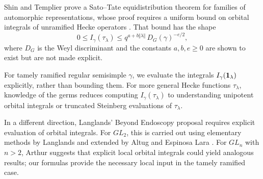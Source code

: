\documentclass{amsart}
\numberwithin{equation}{section}
\theoremstyle{definition}
\def\16{{\bf 16}}
\def\1{{\bf 1}}
\begin{document}
Shin and Templier \cite{ST} prove a Sato--Tate equidistribution theorem for families of automorphic representations, whose proof requires a uniform bound on orbital integrals of unramified Hecke operators \cite[Proposition 7.1]{ST}. That bound has the shape
$$0\le I_\gamma(\tau_\lambda)\le q^{a+b\Vert\lambda\Vert}\,D_G(\gamma)^{-e/2},$$
where $D_G$ is the Weyl discriminant and the constants $a,b,e\ge 0$ are shown to exist but are not made explicit.

For tamely ramified regular semisimple $\gamma$, we evaluate the integrals $I_\gamma(\1_\lambda)$ explicitly, rather than bounding them. For more general Hecke functions $\tau_\lambda$, knowledge of the germs reduces computing $I_\gamma(\tau_\lambda)$ to understanding unipotent orbital integrals or truncated Steinberg evaluations of $\tau_\lambda$.  

In a different direction, Langlands' Beyond Endoscopy proposal \cite{Beyond} requires explicit evaluation of orbital integrals. For $GL_2$, this is carried out using elementary methods by Langlands and extended by Altug \cite{Altug} and Espinosa Lara \cite{MEEL}. For $GL_n$ with $n>2$, Arthur \cite{Arthur} suggests that explicit local orbital integrals could yield analogous results; our formulas provide the necessary local input in the tamely ramified case.
\end{document}
